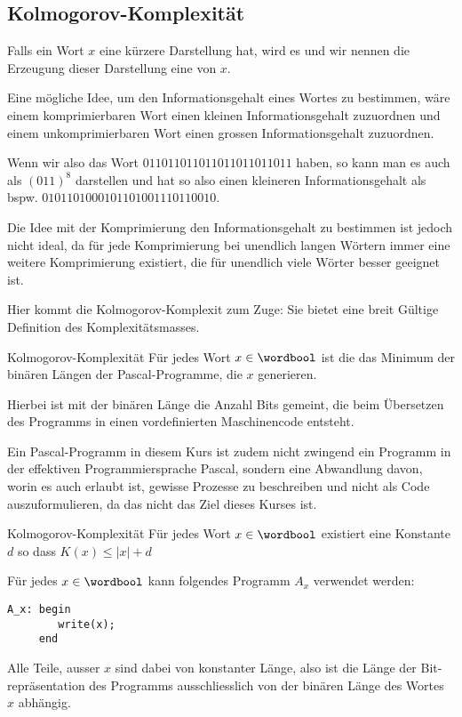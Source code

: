 \newpage
\subsection{Kolmogorov-Komplexität}
Falls ein Wort $x$ eine kürzere Darstellung hat, wird es  und wir nennen die Erzeugung dieser Darstellung eine  von $x$.

Eine mögliche Idee, um den Informationsgehalt eines Wortes zu bestimmen, wäre einem komprimierbaren Wort einen kleinen Informationsgehalt zuzuordnen und einem unkomprimierbaren Wort einen grossen Informationsgehalt zuzuordnen.

Wenn wir also das Wort $011011011011011011011011$ haben, so kann man es auch als $(011)^8$ darstellen und hat so also einen kleineren Informationsgehalt als bspw. $0101101000101101001110110010$.

Die Idee mit der Komprimierung den Informationsgehalt zu bestimmen ist jedoch nicht ideal, da für jede Komprimierung bei unendlich langen Wörtern immer eine weitere Komprimierung existiert, die für unendlich viele Wörter besser geeignet ist.

Hier kommt die Kolmogorov-Komplexit zum Zuge: Sie bietet eine breit Gültige Definition des Komplexitätsmasses.


\begin{definition}[]{Kolmogorov-Komplexität}
    Für jedes Wort $x \in \wordbool$ ist die  das Minimum der binären Längen der Pascal-Programme, die $x$ generieren.
\end{definition}

Hierbei ist mit der binären Länge die Anzahl Bits gemeint, die beim Übersetzen des Programms in einen vordefinierten Maschinencode entsteht.

Ein Pascal-Programm in diesem Kurs ist zudem nicht zwingend ein Programm in der effektiven Programmiersprache Pascal, sondern eine Abwandlung davon, worin es auch erlaubt ist, gewisse Prozesse zu beschreiben und nicht als Code auszuformulieren, da das nicht das Ziel dieses Kurses ist.


\begin{lemma}[]{Kolmogorov-Komplexität}
    Für jedes Wort $x \in \wordbool$ existiert eine Konstante $d$ so dass $K(x) \leq |x| + d$
\end{lemma}
\inlineproof Für jedes $x \in \wordbool$ kann folgendes Programm $A_x$ verwendet werden:

\begin{verbatim}
A_x: begin
        write(x);
     end
\end{verbatim}
Alle Teile, ausser $x$ sind dabei von konstanter Länge, also ist die Länge der Bit-repräsentation des Programms ausschliesslich von der binären Länge des Wortes $x$ abhängig.

